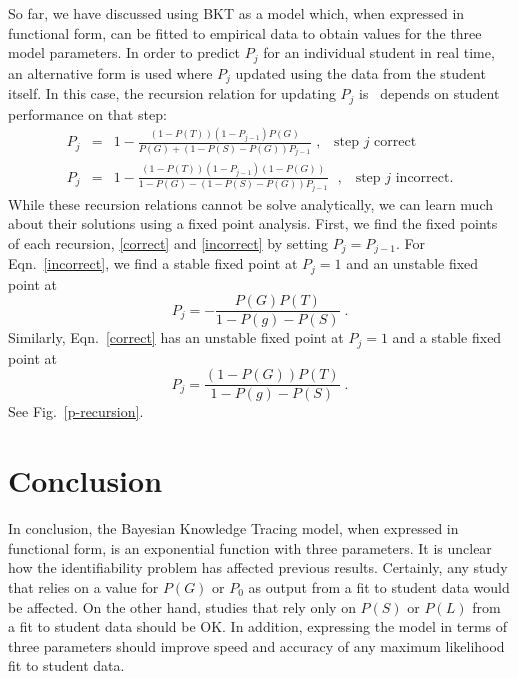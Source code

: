 \documentclass[11pt,letterpaper]{article}
\begin{document}
So far, we have discussed using BKT as a model which, when expressed
in functional form, can be fitted to empirical data to obtain values
for the three model parameters.  In order to predict $P_j$ for an
individual student in real time, an alternative form is used where
$P_j$ updated using the data from the student itself.
In this case, the recursion relation for updating $P_j$ 
is~\cite{corbett_knowledge_1994,baker_more_2008} depends on
student performance on that step:
%
\begin{eqnarray}
       P_j &=&
       1-\frac{\left(1-P(T)\right)\left(1-P_{j-1}\right)P(G)}{P(G)+\left(1-P(S)-P(G)\right)
         P_{j-1}}  \mbox{~,~~ step $j$ correct} \label{correct}\\
       P_j &=& 1-\frac{\left(1-P(T)\right)\left(1-P_{j-1}\right)\left(1-P(G)\right)}
                                 {1-P(G)-\left(1-P(S)-P(G)\right) P_{j-1}}
                        \mbox{~ ,~~ step $j$ incorrect.} \label{incorrect}
\end{eqnarray}
%
While these recursion relations cannot be solve analytically, we
can learn much about their solutions using a fixed point analysis.
First, we find the fixed points of each recursion, \ref{correct} and
\ref{incorrect} by setting $P_j=P_{j-1}$.  For Eqn.~\ref{incorrect}, we
find a stable fixed point at $P_j=1$ and an unstable fixed point at
\begin{equation}
    P_j=- \frac{P(G) P(T)}{1-P(g)-P(S)} \; .
\end{equation}
Similarly, Eqn.~\ref{correct} has an unstable fixed point at $P_j=1$
and a stable fixed point at
\begin{equation}
    P_j=\frac{\left(1-P(G)\right) P(T)}{1-P(g)-P(S)} \; . \label{incorrectfixedpoint}
\end{equation}
See Fig.~\ref{p-recursion}.

\section{Conclusion}

In conclusion, the Bayesian Knowledge Tracing model, when expressed
in functional form, is an exponential function with three parameters.
It is unclear how the identifiability problem has affected previous
results.  Certainly, any study that relies on a value for $P(G)$ or
$P_0$ as output from a fit to student data would be affected.
On the other hand, studies that rely only on $P(S)$ or $P(L)$ from
a fit to student data should be OK.  In addition, expressing
the model in terms of three parameters should improve speed
and accuracy of any maximum likelihood fit to student data.
\end{document}
